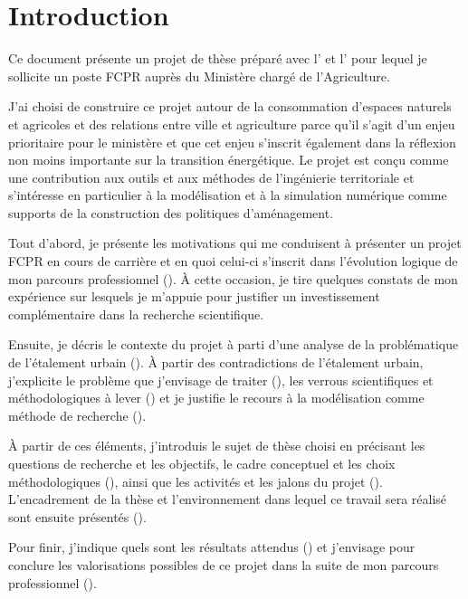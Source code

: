 \section
{Introduction}

Ce document présente un projet de thèse préparé avec l’{\EVS} et l’{\TETIS}
pour lequel je sollicite un poste FCPR auprès du Ministère chargé de
l’Agriculture.

J’ai choisi de construire ce projet autour de la consommation d’espaces
naturels et agricoles et des relations entre ville et agriculture
parce qu’il s’agit d’un enjeu prioritaire pour le ministère
et que cet enjeu s'inscrit également dans la réflexion non moins importante
sur la transition énergétique.
Le projet est conçu comme une contribution aux outils et aux méthodes
de l’ingénierie territoriale et s’intéresse en particulier à la modélisation
et à la simulation numérique comme supports de la construction
des politiques d'aménagement.

Tout d’abord, je présente les motivations qui me conduisent à présenter un
projet FCPR  en cours de carrière et en quoi celui-ci s’inscrit dans l'évolution logique
de mon parcours professionnel (\in[origin]). À cette
occasion, je tire quelques constats de mon expérience sur lesquels
je m'appuie pour justifier un investissement complémentaire dans la recherche
scientifique.

Ensuite, je décris le contexte du projet à parti d’une analyse de la
problématique de l’étalement urbain (\in[contexte]). À partir des contradictions
de l'étalement urbain, j'explicite le problème que j'envisage de traiter (\in[probleme]),
les verrous scientifiques et méthodologiques à lever (\in[verrous]) et je justifie
le recours à la modélisation comme méthode de recherche (\in[methodo]).

À partir de ces éléments, j'introduis le sujet de thèse choisi
en précisant les questions de recherche et les objectifs,
le cadre conceptuel et les choix méthodologiques (\in[sujet]),
ainsi que les activités et les jalons du projet (\in[planning]).
L'encadrement de la thèse et l'environnement dans lequel ce travail
sera réalisé sont ensuite présentés (\in[environnement]).

Pour finir, j’indique quels sont les résultats attendus (\in[resultats]) et j’envisage
pour conclure les valorisations possibles de ce projet dans la suite de mon
parcours professionnel (\in[suites]).